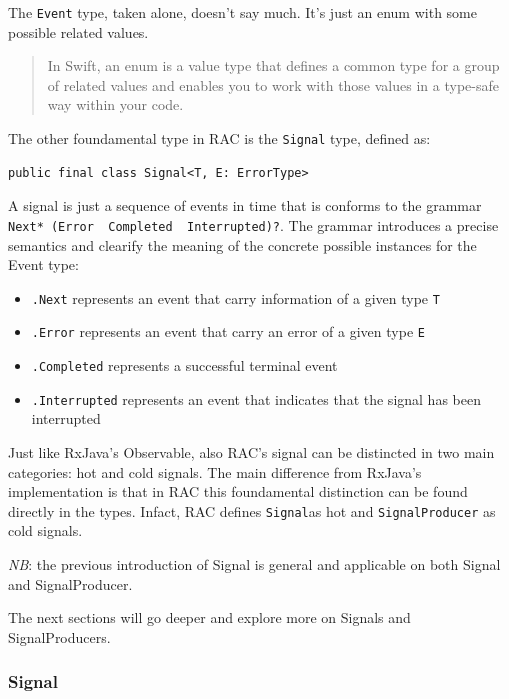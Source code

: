 The \texttt{Event} type, taken alone, doesn't say much. It's just an
enum with some possible related values.

\begin{quote}
In Swift, an enum is a value type that defines a common type for a group
of related values and enables you to work with those values in a
type-safe way within your code.
\end{quote}

The other foundamental type in RAC is the \texttt{Signal} type, defined
as:

\begin{verbatim}
public final class Signal<T, E: ErrorType>
\end{verbatim}

A signal is just a sequence of events in time that is conforms to the
grammar
\texttt{Next*\ (Error\ \textbar{}\ Completed\ \textbar{}\ Interrupted)?}.
The grammar introduces a precise semantics and clearify the meaning of
the concrete possible instances for the Event type:

\begin{itemize}
\itemsep1pt\parskip0pt
\item
  \texttt{.Next} represents an event that carry information of a given
  type \texttt{T}
\item
  \texttt{.Error} represents an event that carry an error of a given
  type \texttt{E}
\item
  \texttt{.Completed} represents a successful terminal event
\item
  \texttt{.Interrupted} represents an event that indicates that the
  signal has been interrupted
\end{itemize}

Just like RxJava's Observable, also RAC's signal can be distincted in
two main categories: hot and cold signals. The main difference from
RxJava's implementation is that in RAC this foundamental distinction can
be found directly in the types. Infact, RAC defines \texttt{Signal}as
hot and \texttt{SignalProducer} as cold signals.

\emph{NB}: the previous introduction of Signal is general and applicable
on both Signal and SignalProducer.

The next sections will go deeper and explore more on Signals and
SignalProducers.

\subsubsection{Signal}\label{signal}

